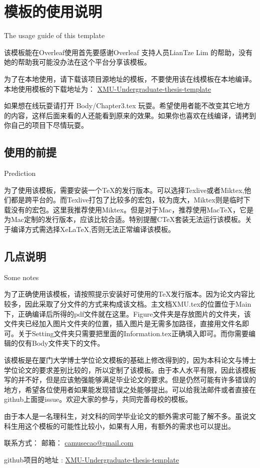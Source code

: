 \chapter{模板的使用说明}{The usage guide of this template}

该模板能在Overleaf使用首先要感谢Overleaf 支持人员LianTze Lim 的帮助，没有她的帮助我可能没办法在这个平台分享该模板。

为了在本地使用，请下载该项目源地址的模板，不要使用该在线模板在本地编译。本地使用模板的下载地址为：  \href{https://github.com/CamuseCao/XMU-Undergraduate-thesis-template}{XMU-Undergraduate-thesis-template}

如果想在线玩耍请打开 Body/Chapter3.tex 玩耍。希望使用者能不改变其它地方的内容，这样后面来看的人还能看到原来的效果。如果你也喜欢在线编译，请拷到你自己的项目下尽情玩耍。

\section{使用的前提}{Prediction}

为了使用该模板，需要安装一个TeX的发行版本。可以选择Texlive或者Miktex,他们都是跨平台的。而Texlive打包了比较多的宏包，较为庞大，Miktex则是临时下载没有的宏包。这里我推荐使用Miktex。但是对于Mac，推荐使用MacTeX，它是为Mac定制的发行版本，应该比较合适。特别提醒CTeX套装无法运行该模板。关于编译方式需选择XeLaTeX,否则无法正常编译该模板。


\section{几点说明}{Some notes}

为了正确使用该模板，请按照提示安装好可使用的TeX发行版本。因为论文内容比较多，因此采取了分文件的方式来构成该文档。主文档XMU.tex的位置位于Main下，正确编译后所得的pdf文件就在这里。Figure文件夹是存放图片的文件夹，该文件夹已经加入图片文件夹的位置，插入图片是无需多加路径，直接用文件名即可。关于Setting文件夹只需要把里面的Information.tex正确填入即可。而你需要编辑的仅有Body文件夹下的文件。

该模板是在厦门大学博士学位论文模板的基础上修改得到的，因为本科论文与博士学位论文的要求差别比较的，所以定制了该模板。由于本人水平有限，因此该模板写的并不好，但是应该勉强能够满足毕业论文的要求。但是仍然可能有许多错误的地方，希望各位使用者如果能发现错误之处能够提出。可以给我法邮件或者直接在github上面提issue。欢迎大家的参与，共同完善母校的模板。

由于本人是一名理科生，对文科的同学毕业论文的额外需求可能了解不多。虽说文科生用这个模板的可能性比较小，如果有人用，有额外的需求也可以提出。

联系方式：
邮箱： \href{mailto:camusecao@gmail.com}{camusecao@gmail.com}

github项目的地址 : \href{https://github.com/CamuseCao/XMU-Undergraduate-thesis-template}{XMU-Undergraduate-thesis-template}
